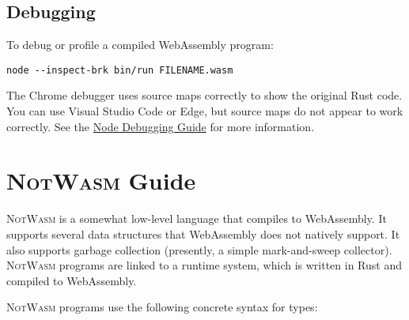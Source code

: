 \documentclass{book}
\newcommand{\notwasm}{\textsc{NotWasm}\xspace}
\begin{document}
\section{Debugging}

To debug or profile a compiled WebAssembly program:

\begin{verbatim}
node --inspect-brk bin/run FILENAME.wasm
\end{verbatim}

The Chrome debugger uses source maps correctly to show the original Rust code.
You can use Visual Studio Code or Edge, but source maps do not appear to work
correctly. See the
\href{https://nodejs.org/en/docs/guides/debugging-getting-started/}{Node
Debugging Guide} for more information.

\chapter{\notwasm Guide}

\notwasm is a somewhat low-level language that compiles to WebAssembly. It
supports several data structures that WebAssembly does not natively support. It
also supports garbage collection (presently, a simple mark-and-sweep collector).
\notwasm programs are linked to a runtime system, which is written in Rust
and compiled to WebAssembly.

\notwasm programs use the following concrete syntax for types:
\end{document}
